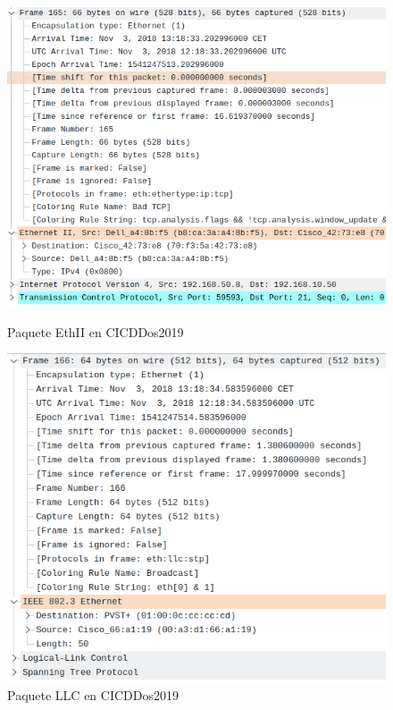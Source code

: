 \begin{figure}[H]
      \includegraphics[width=\linewidth]{media/cicddos_2019_pcap_03-11_0_ethii_packet.png}
      \captionsetup{justification=centering}
      \caption{Paquete EthII en CICDDos2019}\label{fig:cicddos_2019_pcap_03-11_0_ethii_packet}
    \endminipage\hfill
      \includegraphics[width=\linewidth]{media/cicddos_2019_pcap_03-11_0_llc_packet.png}
      \captionsetup{justification=centering}
      \caption{Paquete LLC en CICDDos2019}\label{fig:cicddos_2019_pcap_03-11_0_llc_packet}
    \endminipage\hfill
\end{figure}
